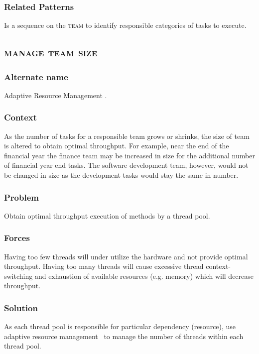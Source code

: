 \documentclass[prodmode]{style/acmlarge}
\begin{document}
\subsubsection*{Related Patterns} Is a sequence on the \textsc{team} to identify
responsible categories of tasks to execute.



\subsection{\textsc{\textbf{manage team size}}}

\subsubsection*{Alternate name} Adaptive Resource Management \cite{seda}. 

\subsubsection*{Context} As the number of tasks for a responsible team grows or
shrinks, the size of team is altered to obtain optimal throughput.  For example,
near the end of the financial year the finance team may be increased in size for
the additional number of financial year end tasks.  The software development
team, however, would not be changed in size as the development tasks would stay
the same in number.

\subsubsection*{Problem} Obtain optimal throughput execution of methods by a
thread pool.

\subsubsection*{Forces} Having too few threads will under utilize the hardware
and not provide optimal throughput.  Having too many threads will cause
excessive thread context-switching and exhaustion of available resources (e.g.
memory) which will decrease throughput.

\subsubsection*{Solution} As each thread pool is responsible for particular
dependency (resource), use adaptive resource management~\cite{seda} to manage
the number of threads within each thread pool.
\end{document}
